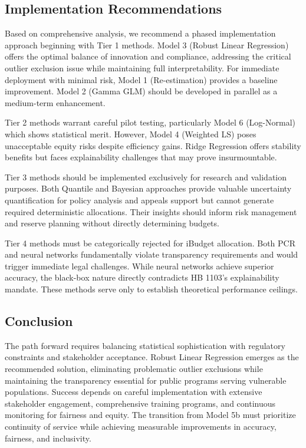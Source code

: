 \subsection{Implementation Recommendations}

Based on comprehensive analysis, we recommend a phased implementation approach beginning with Tier 1 methods. Model 3 (Robust Linear Regression) offers the optimal balance of innovation and compliance, addressing the critical outlier exclusion issue while maintaining full interpretability. For immediate deployment with minimal risk, Model 1 (Re-estimation) provides a baseline improvement. Model 2 (Gamma GLM) should be developed in parallel as a medium-term enhancement.

Tier 2 methods warrant careful pilot testing, particularly Model 6 (Log-Normal) which shows statistical merit. However, Model 4 (Weighted LS) poses unacceptable equity risks despite efficiency gains. Ridge Regression offers stability benefits but faces explainability challenges that may prove insurmountable.

Tier 3 methods should be implemented exclusively for research and validation purposes. Both Quantile and Bayesian approaches provide valuable uncertainty quantification for policy analysis and appeals support but cannot generate required deterministic allocations. Their insights should inform risk management and reserve planning without directly determining budgets.

Tier 4 methods must be categorically rejected for iBudget allocation. Both PCR and neural networks fundamentally violate transparency requirements and would trigger immediate legal challenges. While neural networks achieve superior accuracy, the black-box nature directly contradicts HB 1103's explainability mandate. These methods serve only to establish theoretical performance ceilings.

\subsection{Conclusion}

The path forward requires balancing statistical sophistication with regulatory constraints and stakeholder acceptance. Robust Linear Regression emerges as the recommended solution, eliminating problematic outlier exclusions while maintaining the transparency essential for public programs serving vulnerable populations. Success depends on careful implementation with extensive stakeholder engagement, comprehensive training programs, and continuous monitoring for fairness and equity. The transition from Model 5b must prioritize continuity of service while achieving measurable improvements in accuracy, fairness, and inclusivity.

